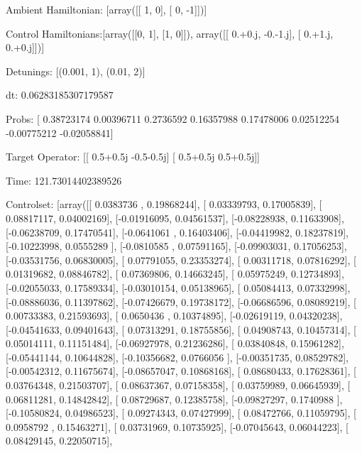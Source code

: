 \documentclass{article}
\begin{document}
    

\newpage

Ambient Hamiltonian: [array([[ 1,  0],
       [ 0, -1]])]

Control Hamiltonians:[array([[0, 1],
       [1, 0]]), array([[ 0.+0.j, -0.-1.j],
       [ 0.+1.j,  0.+0.j]])]

Detunings: [(0.001, 1), (0.01, 2)]

 dt: 0.06283185307179587

Probs: [ 0.38723174  0.00396711  0.2736592   0.16357988  0.17478006  0.02512254
 -0.00775212 -0.02058841]

Target Operator: [[ 0.5+0.5j -0.5-0.5j]
 [ 0.5+0.5j  0.5+0.5j]]

Time: 121.73014402389526

Controlset: [array([[ 0.0383736 ,  0.19868244],
       [ 0.03339793,  0.17005839],
       [ 0.08817117,  0.04002169],
       [-0.01916095,  0.04561537],
       [-0.08228938,  0.11633908],
       [-0.06238709,  0.17470541],
       [-0.0641061 ,  0.16403406],
       [-0.04419982,  0.18237819],
       [-0.10223998,  0.0555289 ],
       [-0.0810585 ,  0.07591165],
       [-0.09903031,  0.17056253],
       [-0.03531756,  0.06830005],
       [ 0.07791055,  0.23353274],
       [ 0.00311718,  0.07816292],
       [ 0.01319682,  0.08846782],
       [ 0.07369806,  0.14663245],
       [ 0.05975249,  0.12734893],
       [-0.02055033,  0.17589334],
       [-0.03010154,  0.05138965],
       [ 0.05084413,  0.07332998],
       [-0.08886036,  0.11397862],
       [-0.07426679,  0.19738172],
       [-0.06686596,  0.08089219],
       [ 0.00733383,  0.21593693],
       [ 0.0650436 ,  0.10374895],
       [-0.02619119,  0.04320238],
       [-0.04541633,  0.09401643],
       [ 0.07313291,  0.18755856],
       [ 0.04908743,  0.10457314],
       [ 0.05014111,  0.11151484],
       [-0.06927978,  0.21236286],
       [ 0.03840848,  0.15961282],
       [-0.05441144,  0.10644828],
       [-0.10356682,  0.0766056 ],
       [-0.00351735,  0.08529782],
       [-0.00542312,  0.11675674],
       [-0.08657047,  0.10868168],
       [ 0.08680433,  0.17628361],
       [ 0.03764348,  0.21503707],
       [ 0.08637367,  0.07158358],
       [ 0.03759989,  0.06645939],
       [ 0.06811281,  0.14842842],
       [ 0.08729687,  0.12385758],
       [-0.09827297,  0.1740988 ],
       [-0.10580824,  0.04986523],
       [ 0.09274343,  0.07427999],
       [ 0.08472766,  0.11059795],
       [ 0.0958792 ,  0.15463271],
       [ 0.03731969,  0.10735925],
       [-0.07045643,  0.06044223],
       [ 0.08429145,  0.22050715],
\end{document}

